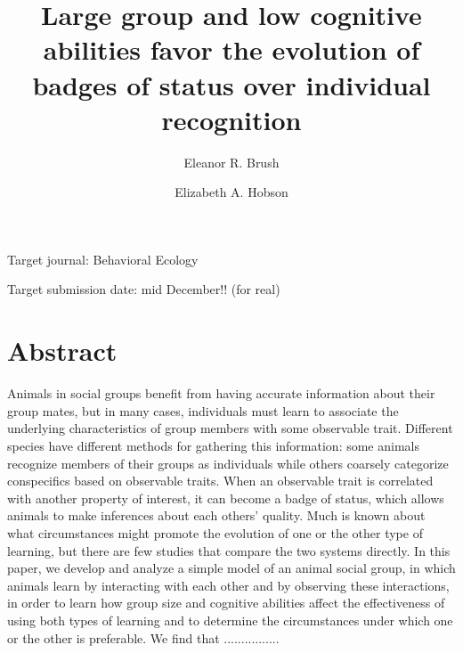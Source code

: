 

\noindent
\title{Large group and low cognitive abilities favor the evolution of badges of status over individual recognition} 

\author[1]{Eleanor R. Brush}

\author[2]{Elizabeth A. Hobson}
\maketitle

Target journal: Behavioral Ecology 

Target submission date: mid December!! (for real)

\linenumbers
\section*{Abstract}
Animals in social groups benefit from having accurate information about their group mates, but in many cases, individuals must learn to associate the underlying characteristics of group members with some observable trait. Different species have different methods for gathering this information: some animals recognize members of their groups as individuals while others coarsely categorize conspecifics based on observable traits. When an observable trait is correlated with another property of interest, it can become a badge of status, which allows animals to make inferences about each others' quality. Much is known about what circumstances might promote the evolution of one or the other type of learning, but there are few studies that compare the two systems directly. In this paper, we develop and analyze a simple model of an animal social group, in which animals learn by interacting with each other and by observing these interactions, in order to learn how group size and cognitive abilities affect the effectiveness of using both types of learning and to determine the circumstances under which one or the other is preferable. We find that ................



